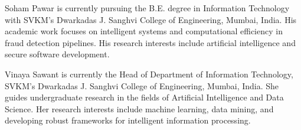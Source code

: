 \documentclass[lettersize,journal]{IEEEtran}
\begin{document}
\begin{IEEEbiographynophoto}{Soham Pawar}
is currently pursuing the B.E. degree in Information Technology with SVKM's Dwarkadas J. Sanghvi College of Engineering, Mumbai, India. His academic work focuses on intelligent systems and computational efficiency in fraud detection pipelines. His research interests include artificial intelligence and secure software development.
\end{IEEEbiographynophoto}

\begin{IEEEbiographynophoto}{Vinaya Sawant}
is currently the Head of Department of Information Technology, SVKM's Dwarkadas J. Sanghvi College of Engineering, Mumbai, India. She guides undergraduate research in the fields of Artificial Intelligence and Data Science. Her research interests include machine learning, data mining, and developing robust frameworks for intelligent information processing.
\end{IEEEbiographynophoto}

\vfill
\end{document}
